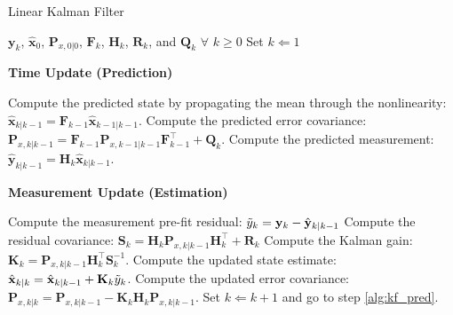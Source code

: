 \begin{algorithm}[!htb]
\caption{Linear Kalman Filter}\label{alg:lkf}
\begin{algorithmic}[1]
\footnotesize \REQUIRE $\mathbf{y}_{k}$, $\hat{\mathbf{x}}_0$, $\mathbf{P}_{x,0|0}$, $\mathbf{F}_{k}$, $\mathbf{H}_{k}$,  $\mathbf{R}_{k}$, and $\mathbf{Q}_{k}$ $\forall$ $k \geq 0$
\medskip
\STATE Set ${k} \Leftarrow 1$
\begin{center}
\textbf{Time Update (Prediction)}
\end{center}
\STATE \label{alg:kf_pred} Compute the predicted state by propagating the mean through the nonlinearity: $\hat{\mathbf{x}}_{k|k-1} = \mathbf{F}_{k-1}\hat{\mathbf{x}}_{k-1|k-1}$.
\STATE \label{alg:kf_cov_pred} Compute the predicted error covariance:
$\mathbf{P}_{x,k|k-1}  = \mathbf{F}_{k-1} \mathbf{P}_{x,k-1|k-1}
\mathbf{F}_{k-1}^\top + \mathbf{Q}_k$.
\medskip
\STATE \label{alg:kf_meas} Compute the predicted measurement: $\hat{\mathbf{y}}_{k|k-1} = \mathbf{H}_{k}\hat{\mathbf{x}}_{k|k-1}$.
\begin{center}
\medskip %
\textbf{Measurement Update (Estimation)}
\end{center}
\STATE \label{alg:kf_innov} Compute the measurement pre-fit residual: $\Tilde{y}_{k} = \mathbf{y}_{k}-\hat{\mathbf{y}}_{k|k-1}$
\STATE Compute the residual covariance: $\mathbf{S}_{k} = \mathbf{H}_{k}\mathbf{P}_{x,k|k-1}\mathbf{H}_{k}^\top + \mathbf{R}_{k}$
\STATE Compute the Kalman gain: $\mathbf{K}_{k}= \mathbf{P}_{x,k|k-1}\mathbf{H}_{k}^\top
\mathbf{S}_{k}^{-1}$.
\STATE \label{alg:kf_state_post} Compute the updated state estimate: $\hat{\mathbf{x}}_{k|k} = \hat{\mathbf{x}}_{k|k-1}+\mathbf{K}_{k}\Tilde{y}_{k}$.
\STATE \label{alg:kf_cov_post} Compute the updated error covariance:
$\mathbf{P}_{x,k|k} = \mathbf{P}_{x,k|k-1} - \mathbf{K}_{k}\mathbf{H}_{k}\mathbf{P}_{x,k|k-1}$.
\medskip
\STATE Set $k \Leftarrow k+1$ and go to step
\ref{alg:kf_pred}.
\end{algorithmic}
\end{algorithm}

\subsection{} \label{sec:A3}

